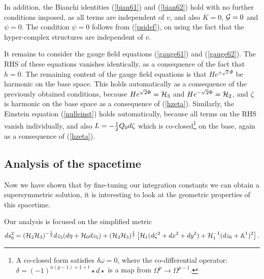 In addition, the Bianchi identities ({\ref{bian61}}) and ({\ref{bian62}}) hold with no further conditions imposed, as all terms are independent of $v$, and also $K=0$,
${\cal{G}}=0$ and $\psi=0$. The condition $\psi=0$ follows from ({\ref{psidef}}), on using the fact that the hyper-complex structures are independent of $v$.

It remains to consider the gauge field equations ({\ref{gauge61}}) and ({\ref{gauge62}}). The RHS of these equations vanishes identically, as a consequence of the fact that $h=0$. The remaining content of the gauge field equations is that $He^{\pm \sqrt{2} \Phi}$ be harmonic on the base space. This holds automatically as a consequence of the previously obtained conditions, because
$He^{\sqrt{2} \Phi}= {\cal H}_3$ and $He^{-\sqrt{2} \Phi}= {\cal H}_2$, and $\zeta$ is harmonic on the base space as a consequence of ({\ref{hzeta}}). Similarly, the Einstein equation ({\ref{nulleinst}}) holds automatically, because all terms on the RHS vanish individually, and also $L=-{1 \over 2} Q_0 d \zeta$ which is co-closed\footnote{A co-closed form satisfies $\delta \omega = 0$, where the co-differential operator: $\delta = (-1)^{n(p-1) + 1 + t}\star d \star$ is a map from $\Omega^{p} \to \Omega^{p-1}$.} on the base, again as a consequence of ({\ref{hzeta}}).


\subsection{Analysis of the spacetime}
Now we have shown that by fine-tuning our integration constants we can obtain a supersymmetric solution, it is interesting to look at the geometric properties of this spacetime.

Our analysis is focused on the simplified metric
\begin{equation*}
        ds^2_6 = ({\cal H}_2 {\cal H}_3)^{-\frac{1}{2}} dz_5 (d\eta + {\cal H}_0 dz_5) + ({\cal H}_2 {\cal H}_3)^{\frac{1}{2}} \left[{\cal H}_1 ( d\zeta^2 + dx^2 + dy^2) + {\cal H}_1^{-1} (dz_6 + \mathbb{A}^1)^2 \right].
\end{equation*}

